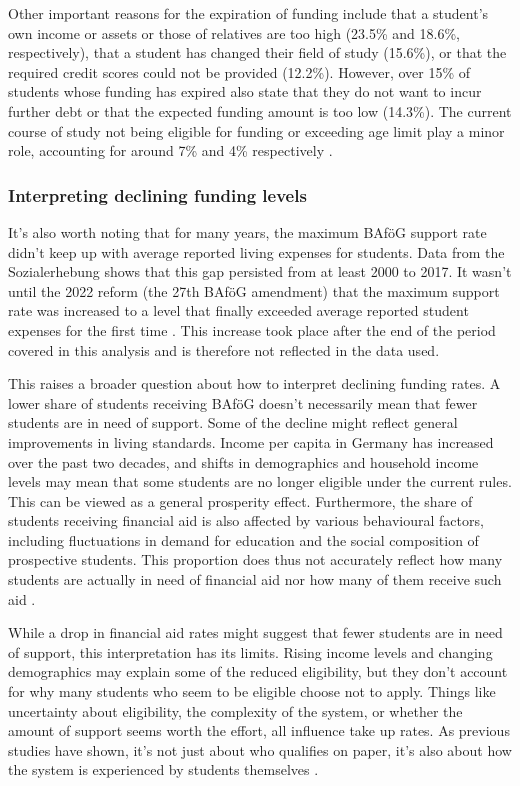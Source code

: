 Other important reasons for the expiration of funding include that a student's own income or assets or those of relatives are too high (23.5\% and 18.6\%, respectively), that a student has changed their field of study (15.6\%), or that the required credit scores could not be provided (12.2\%). However, over 15\% of students whose funding has expired also state that they do not want to incur further debt or that the expected funding amount is too low (14.3\%). The current course of study not being eligible for funding or exceeding age limit play a minor role, accounting for around 7\% and 4\% respectively \citep{kroher_studierendenbefragung_2023}.

\subsubsection*{Interpreting declining funding levels}
\label{subsection:interpreting-declining-funding-levels}

It’s also worth noting that for many years, the maximum BAföG support rate didn’t keep up with average reported living expenses for students. Data from the Sozialerhebung shows that this gap persisted from at least 2000 to 2017. It wasn’t until the 2022 reform (the 27th BAföG amendment) that the maximum support rate was increased to a level that finally exceeded average reported student expenses for the first time \citep{meier_bafog_2024}. This increase took place after the end of the period covered in this analysis and is therefore not reflected in the data used.

This raises a broader question about how to interpret declining funding rates. A lower share of students receiving BAföG doesn’t necessarily mean that fewer students are in need of support. Some of the decline might reflect general improvements in living standards. Income per capita in Germany has increased over the past two decades, and shifts in demographics and household income levels may mean that some students are no longer eligible under the current rules. This can be viewed as a general prosperity effect. Furthermore, the share of students receiving financial aid is also affected by various behavioural factors, including fluctuations in demand for education and the social composition of prospective students. This proportion does thus not accurately reflect how many students are actually in need of financial aid nor how many of them receive such aid \citep{meier_bafog_2024}.

While a drop in financial aid rates might suggest that fewer students are in need of support, this interpretation has its limits. Rising income levels and changing demographics may explain some of the reduced eligibility, but they don't account for why many students who seem to be eligible choose not to apply. Things like uncertainty about eligibility, the complexity of the system, or whether the amount of support seems worth the effort, all influence take up rates. As previous studies have shown, it’s not just about who qualifies on paper, it’s also about how the system is experienced by students themselves \citep{meier_bafog_2024}.


